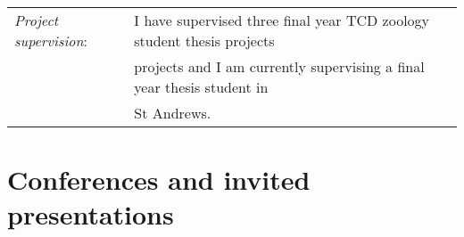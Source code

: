 \documentclass[10pt,a4paper]{article}
\begin{document}
\begin{flushleft}
\begin{tabular}{ll}
\textit{Project supervision}:&\hspace{5.7mm} I have supervised three final year TCD zoology student thesis projects\\
&\hspace{5.7mm} projects and I am currently supervising a final year thesis student in\\
&\hspace{5.7mm} St Andrews.

\end{tabular}

\bigskip




\section{Conferences and invited presentations}


\end{flushleft}
\end{document}
